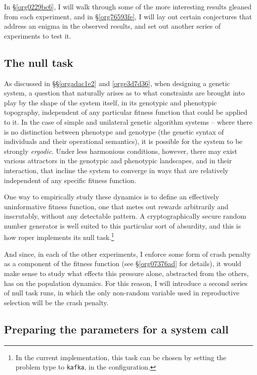 \documentclass[12pt,glossary]{dalthesis}
\begin{document}
In \S \ref{org0229bc6}, I will walk through some of the more interesting results
gleaned from each experiment, and in \S \ref{org76593fe}, I will lay out certain
conjectures that address an enigma in the observed results, and set out another
series of experiments to test it. 

\subsection{The null task}
\label{sec:orgd9152ce}
\label{orgf4c63b5}

As discussed in \S\S \ref{orgadac1e2} and \ref{orge3d7d36}, when designing a genetic
system, a question that naturally arises as to what constraints are brought into
play by the shape of the system itself, in its genotypic and phenotypic topography,
independent of any particular fitness function that could be applied to it. In the
case of simple and unilateral genetic algorithm systems -- where there is no distinction
between phenotype and genotype (the genetic syntax of individuals and their 
operational semantics), it is possible for the system to be strongly \emph{ergodic}.
Under less harmonious conditions, however, there may exist various attractors in
the genotypic and phenotypic landscapes, and in their interaction, that incline
the system to converge in ways that are relatively independent of any specific
fitness function. 

One way to empirically study these dynamics is to define an
effectively uninformative fitness function, one that metes out rewards arbitrarily
and inscrutably, without any detectable pattern. A cryptographically secure
random number generator is well suited to this particular sort of absurdity, and
this is how \gls{roper} implements its null task.\footnote{In the current implementation, this task can be chosen by setting the 
  problem type to \texttt{kafka}, in the configuration.} 

And since, in each of the other experiments, I enforce some form of crash penalty
as a component of the fitness function (see \S \ref{org07376ad} for details),
it would make sense to study what effects this pressure alone, abstracted from
the others, has on the population dynamics. For this reason, I will introduce
a second series of null task runs, in which the only non-random variable used
in reproductive selection will be the crash penalty. 

\subsection{Preparing the parameters for a system call}
\label{sec:org25afc5e}
\label{orgb70c532}
\end{document}
